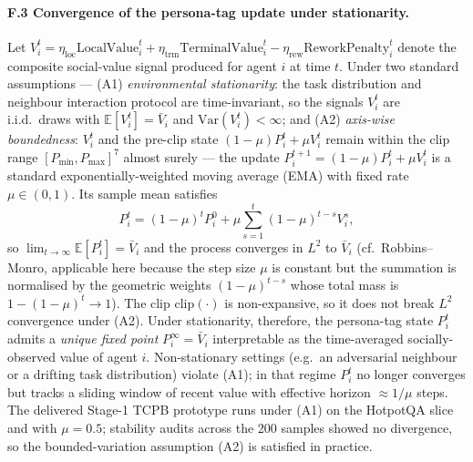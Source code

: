 \paragraph{F.3 Convergence of the persona-tag update under stationarity.} Let $V_i^t{=}\eta_{\mathrm{loc}}\mathrm{LocalValue}_i^t{+}\eta_{\mathrm{trm}}\mathrm{TerminalValue}_i^t{-}\eta_{\mathrm{rew}}\mathrm{ReworkPenalty}_i^t$ denote the composite social-value signal produced for agent $i$ at time $t$. Under two standard assumptions --- (A1) \emph{environmental stationarity}: the task distribution and neighbour interaction protocol are time-invariant, so the signals $V_i^t$ are i.i.d.\ draws with $\mathbb{E}[V_i^t]{=}\bar V_i$ and $\mathrm{Var}(V_i^t){<}\infty$; and (A2) \emph{axis-wise boundedness}: $V_i^t$ and the pre-clip state $(1-\mu)P_i^t+\mu V_i^t$ remain within the clip range $[P_{\min}, P_{\max}]^{7}$ almost surely --- the update $P_i^{t+1}{=}(1{-}\mu)P_i^t{+}\mu V_i^t$ is a standard exponentially-weighted moving average (EMA) with fixed rate $\mu\in(0,1)$. Its sample mean satisfies
\[
P_i^{t} = (1-\mu)^{t} P_i^{0} + \mu\sum_{s=1}^{t}(1-\mu)^{t-s}V_i^{s},
\]
so $\lim_{t\to\infty}\mathbb{E}[P_i^t]{=}\bar V_i$ and the process converges in $L^{2}$ to $\bar V_i$ (cf.\ Robbins--Monro, applicable here because the step size $\mu$ is constant but the summation is normalised by the geometric weights $(1-\mu)^{t-s}$ whose total mass is $1-(1-\mu)^{t}\to 1$). The clip $\mathrm{clip}(\cdot)$ is non-expansive, so it does not break $L^{2}$ convergence under (A2). Under stationarity, therefore, the persona-tag state $P_i^t$ admits a \emph{unique fixed point} $P_i^\infty{=}\bar V_i$ interpretable as the time-averaged socially-observed value of agent $i$. Non-stationary settings (e.g.\ an adversarial neighbour or a drifting task distribution) violate (A1); in that regime $P_i^t$ no longer converges but tracks a sliding window of recent value with effective horizon $\approx 1/\mu$ steps. The delivered Stage-1 TCPB prototype runs under (A1) on the HotpotQA slice and with $\mu{=}0.5$; stability audits across the 200 samples showed no divergence, so the bounded-variation assumption (A2) is satisfied in practice.

